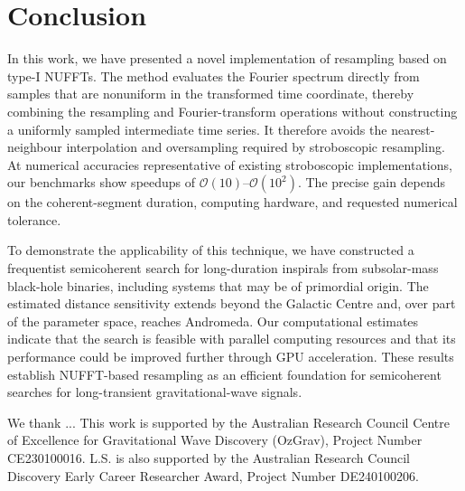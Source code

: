 \documentclass[aps,prd,amsmath,floats,floatfix, twocolumn,
superscriptaddress,nofootinbib,showpacs]{revtex4-2}
\begin{document}



\section{Conclusion}
\label{sec:conclusion}
In this work, we have presented a novel implementation of resampling based on
type-I NUFFTs. The method evaluates the Fourier spectrum directly from samples
that are nonuniform in the transformed time coordinate, thereby combining the
resampling and Fourier-transform operations without constructing a uniformly
sampled intermediate time series. It therefore avoids the nearest-neighbour
interpolation and oversampling required by stroboscopic resampling. At
numerical accuracies representative of existing stroboscopic implementations,
our benchmarks show speedups of $\mathcal{O}(10)$--$\mathcal{O}(10^2)$. The precise gain
depends on the coherent-segment duration, computing hardware, and requested
numerical tolerance.

To demonstrate the applicability of this technique, we have constructed a
frequentist semicoherent search for long-duration inspirals from subsolar-mass
black-hole binaries, including systems that may be of primordial origin. The
estimated distance sensitivity extends beyond the Galactic Centre and, over
part of the parameter space, reaches Andromeda. Our computational estimates
indicate that the search is feasible with parallel computing resources and
that its performance could be improved further through GPU acceleration.
These results establish NUFFT-based resampling as an efficient foundation for
semicoherent searches for long-transient gravitational-wave
signals. 

\begin{acknowledgments}
We thank ...
This work is supported by the Australian Research Council Centre of Excellence for Gravitational Wave Discovery (OzGrav), Project Number CE230100016. 
L.S. is also supported by the Australian Research Council Discovery Early Career Researcher Award, Project Number DE240100206. 
\end{acknowledgments}  
\end{document}
